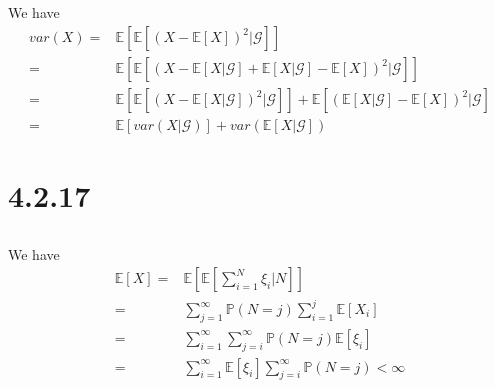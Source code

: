 \documentclass[11pt,a4paper]{ctexart}
\numberwithin{equation}{section}%
\begin{document}
\subsection{}
We have
\begin{align*}
    var(X)=& \mathbb{E}\left[ \mathbb{E}\left[ (X-\mathbb{E}\left[ X \right] )^2 | \mathcal{G} \right]  \right]  \\
    =&\mathbb{E}\left[ \mathbb{E}\left[ (X-\mathbb{E}\left[ X|\mathcal{G} \right] + \mathbb{E}\left[ X|\mathcal{G} \right] -\mathbb{E}\left[ X \right]  )^2 | \mathcal{G} \right]  \right]\\
    =&\mathbb{E}\left[ \mathbb{E}\left[ (X-\mathbb{E}\left[ X|\mathcal{G} \right] )^2   |\mathcal{G} \right]  \right]  + \mathbb{E}\left[ (\mathbb{E}\left[ X|\mathcal{G} \right] -\mathbb{E}\left[ X \right]  )^2 |\mathcal{G} \right]   \\
    =& \mathbb{E}\left[ var(X|\mathcal{G}) \right] + var(\mathbb{E}\left[ X|\mathcal{G} \right] )
\end{align*}


\section{4.2.17}

\subsection{}
We have
\begin{align*}
    \mathbb{E}\left[ X \right] =& \mathbb{E}\left[ \mathbb{E}\left[ \sum_{i=1}^N \xi _i |N \right]  \right]\\
    =& \sum_{j=1}^\infty \mathbb{P}\left( N=j \right) \sum_{i=1}^j \mathbb{E}\left[ X_i \right] \\
    =& \sum_{i=1}^\infty\sum_{j=i}^\infty \mathbb{P}\left( N= j \right) \mathbb{E}\left[ \xi _i \right] \\
    =& \sum_{i=1}^\infty \mathbb{E}\left[ \xi _i \right] \sum_{j=i}^\infty \mathbb{P}\left( N= j \right) <\infty
\end{align*}
\end{document}

